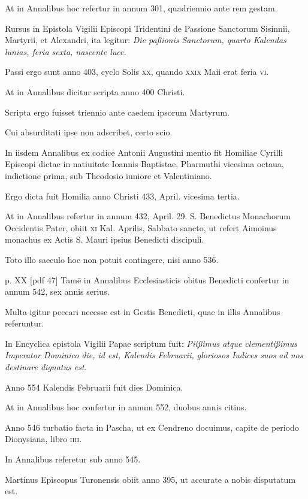 \begin{parnumbers}
At in Annalibus hoc refertur in annum 301, quadriennio
ante rem gestam.

Rursus in Epistola Vigilii Episcopi Tridentini
de Passione Sanctorum Sisinnii, Martyrii, et Alexandri,
ita legitur: \textit{Die paßionis Sanctorum, quarto Kalendas lunias, feria
sexta, nascente luce.}

Passi ergo sunt anno 403, cyclo Solis \textsc{xx}, quando
\textsc{xxix} Maii erat feria \textsc{vi}.

At in Annalibus dicitur scripta
anno 400 Christi.

Scripta ergo fuisset triennio ante caedem
ipsorum Martyrum.

Cui absurditati ipse non adscribet, certo scio.

In iisdem
Annalibus ex codice Antonii Augustini mentio fit Homiliae
Cyrilli Episcopi dictae in natiuitate Ioannis Baptistae, Pharmuthi
vicesima octaua, indictione prima, sub Theodosio iuniore et Valentiniano.

Ergo dicta fuit Homilia anno Christi 433, April. vicesima
tertia.

At in Annalibus refertur in annum 432, April. 29. S. Benedictus
Monachorum Occidentis Pater, obiit \textsc{xi} Kal. Aprilis, Sabbato
sancto, ut refert Aimoinus monachus ex Actis S. Mauri ipsius
Benedicti discipuli.

Toto illo saeculo hoc non potuit contingere, nisi
anno 536.

\clearpage
p. XX [pdf 47]
Tamē in Annalibus Ecclesiasticis obitus Benedicti confertur
in annum 542, sex annis serius.

Multa igitur peccari necesse est
in Gestis Benedicti, quae in illis Annalibus referuntur.

In Encyclica
epistola Vigilii Papae scriptum fuit: \textit{Piißimus atque clementißimus
Imperator Dominico die, id est, Kalendis Februarii, gloriosos Iudices suos
ad nos destinare dignatus est.}

Anno 554 Kalendis Februarii fuit dies
Dominica.

At in Annalibus hoc confertur in annum 552, duobus
annis citius.

Anno 546 turbatio facta in Pascha, ut ex Cendreno docuimus,
capite de periodo Dionysiana, libro \textsc{iiii}.

In Annalibus referetur
sub anno 545.

Martinus Episcopus Turonensis obiit anno
395, ut accurate a nobis disputatum est.


\end{parnumbers}
